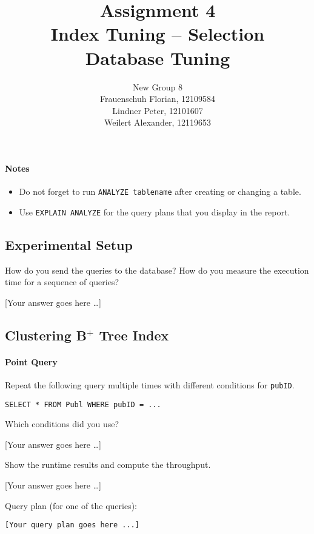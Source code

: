 \documentclass[11pt]{scrartcl}
\title{
  \textbf{\large Assignment 4} \\
  Index Tuning -- Selection \\
  {\large Database Tuning}}
\author{
  New Group 8 \\
  \large Frauenschuh Florian, 12109584 \\
  \large Lindner Peter, 12101607 \\
  \large Weilert Alexander, 12119653
}
\newcommand{\youranswerhere}{[Your answer goes here \ldots]}
\begin{document}
\maketitle

\paragraph{Notes}

\begin{itemize}
  \item Do not forget to run \lstinline[style=dbtsql]{ANALYZE tablename} after creating or changing a table.
  \item Use \lstinline[style=dbtsql]{EXPLAIN ANALYZE} for the query plans that you display in the report.
\end{itemize}

\subsection*{Experimental Setup}

How do you send the queries to the database? How do you measure the execution time for a sequence of queries?

\youranswerhere{}

\subsection*{Clustering B$^+$ Tree Index}

\paragraph{Point Query}

Repeat the following query multiple times with different conditions for \texttt{pubID}.

\begin{lstlisting}[style=dbtsql]
SELECT * FROM Publ WHERE pubID = ...
\end{lstlisting}

Which conditions did you use?

\youranswerhere{}

Show the runtime results and compute the throughput.

\youranswerhere{}

Query plan (for one of the queries):

{\small
\parskip0pt\begin{verbatim}
[Your query plan goes here ...]
\end{verbatim}}
\end{document}
